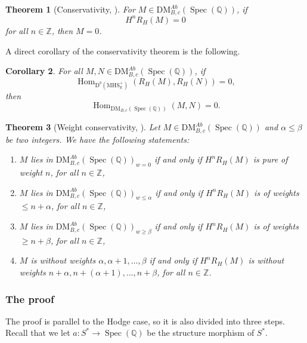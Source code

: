 \documentclass[11pt, a4paper]{amsart}
\theoremstyle{plain}
\newtheorem{theorem}{Theorem}[section]
\newtheorem{corollary}[theorem]{Corollary}
\theoremstyle{definition}
\numberwithin{equation}{section}
\def\QQ{\mathbb{Q}}
\def\RR{\mathbb{R}}
\def\ZZ{\mathbb{Z}}
\DeclareMathOperator{\Hom}{Hom}
\DeclareMathOperator{\Spec}{Spec}
\begin{document}
\begin{theorem}[Conservativity, {\cite[Theorem 1.12.]{Wild_15}}]
\label{Theorem: conservativity}
    For $M \in \mathrm{DM}_{B, c}^{Ab}(\Spec(\QQ))$, if 
    \begin{equation*}
        H^{n} R_{H}(M) = 0
    \end{equation*}
    for all $n \in \ZZ$, then $M = 0$. 
\end{theorem}

A direct corollary of the conservativity theorem is the following. 
\begin{corollary}
\label{corllaray: conservativity}
For all $M, N \in \mathrm{DM}_{B, c}^{Ab}(\Spec(\QQ))$, if 
\begin{equation*}
    \Hom_{\mathrm{D}^{b}(\mathrm{MHS}_{\RR}^{+})}(R_{H}(M), R_{H}(N)) = 0, 
\end{equation*}
then 
\begin{equation*}
    \Hom_{\mathrm{DM}_{B, c}(\Spec(\QQ))}(M, N) = 0. 
\end{equation*}
\end{corollary}

\begin{theorem}[Weight conservativity, {\cite[Theorem 1.13]{Wild_15}}]
\label{Theorem: weight conservativity}
    Let $M \in \mathrm{DM}_{B, c}^{Ab}(\Spec(\QQ))$ and $\alpha \le \beta$ be two integers. We have the following statements: 
    \begin{enumerate}
        \item $M$ lies in $\mathrm{DM}_{B, c}^{Ab}(\Spec(\QQ))_{w = 0}$ if and only if $H^{n}R_{H}(M)$ is pure of weight $n$, for all $n \in \ZZ$,
        \item $M$ lies in $\mathrm{DM}_{B, c}^{Ab}(\Spec(\QQ))_{w \le \alpha}$ if and only if $H^{n}R_{H}(M)$ is of weights $\le n + \alpha$, for all $n \in \ZZ$, 
        \item $M$ lies in $\mathrm{DM}_{B,c }^{Ab}(\Spec(\QQ))_{w \ge \beta}$ if and only if $H^{n}R_{H}(M)$ is of weights $\ge n + \beta$, for all $n \in \ZZ$,
        \item $M$ is without weights $\alpha, \alpha + 1, \ldots, \beta$ if and only if $H^{n}R_{H}(M)$ is without weights $n + \alpha, n + (\alpha + 1), \ldots, n + \beta$, for all $n \in \ZZ$. 
    \end{enumerate}
\end{theorem}


\subsubsection{The proof}
The proof is parallel to the Hodge case, so it is also divided into three steps. 
Recall that we let $a \colon S^{*} \rightarrow \Spec(\QQ)$ be the structure morphism of $S^{*}$. \\
\end{document}
